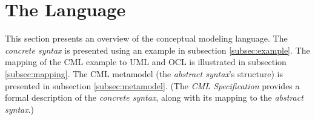 \section{The Language}\label{sec:lang}
%
This section presents an overview of the conceptual modeling language.
The \emph{concrete syntax} is presented using an example in subsection \ref{subsec:example}.
The mapping of the CML example to UML \cite{uml} and OCL \cite{ocl} is illustrated in subsection \ref{subsec:mapping}.
The CML metamodel (the \emph{abstract syntax}'s structure) is presented in subsection \ref{subsec:metamodel}.
(The \emph{CML Specification} \cite{cml-repo} provides a formal description of the \emph{concrete syntax},
along with its mapping to the \emph{abstract syntax}.)




